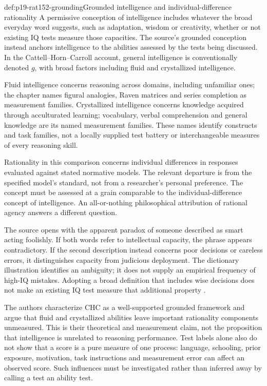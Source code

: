 \begin{hbdefinition}{def:p19-rat152-grounding}{Grounded intelligence and individual-difference rationality}
A permissive conception of intelligence includes whatever the broad everyday
word suggests, such as adaptation, wisdom or creativity, whether or not
existing IQ tests measure those capacities. The source's grounded conception
instead anchors intelligence to the abilities assessed by the tests being
discussed. In the Cattell--Horn--Carroll account, general intelligence is
conventionally denoted \(g\), with broad factors including fluid and
crystallized intelligence.

Fluid intelligence concerns reasoning across domains, including unfamiliar
ones; the chapter names figural analogies, Raven matrices and series
completion as measurement families. Crystallized intelligence concerns
knowledge acquired through acculturated learning; vocabulary, verbal
comprehension and general knowledge are its named measurement families.
These names identify constructs and task families, not a locally supplied
test battery or interchangeable measures of every reasoning skill.

Rationality in this comparison concerns individual differences in responses
evaluated against stated normative models. The relevant departure is from
the specified model's standard, not from a researcher's personal preference.
The concept must be assessed at a grain comparable to the individual-difference
concept of intelligence. An all-or-nothing philosophical attribution of
rational agency answers a different question.
\end{hbdefinition}

The source opens with the apparent paradox of someone described as smart
acting foolishly. If both words refer to intellectual capacity, the phrase
appears contradictory. If the second description instead concerns poor
decisions or careless errors, it distinguishes capacity from judicious
deployment. The dictionary illustration identifies an ambiguity; it does
not supply an empirical frequency of high-IQ mistakes. Adopting a broad
definition that includes wise decisions does not make an existing IQ test
measure that additional property
\cite[secs.~1--2, pp.~791--792]{StanovichToplakWest2021Intelligence}.

The authors characterize CHC as a well-supported grounded framework and
argue that fluid and crystallized abilities leave important rationality
components unmeasured. This is their theoretical and measurement claim,
not the proposition that intelligence is unrelated to reasoning performance.
Test labels alone also do not show that a score is a pure measure of one
process: language, schooling, prior exposure, motivation, task instructions
and measurement error can affect an observed score. Such influences must
be investigated rather than inferred away by calling a test an ability test.

